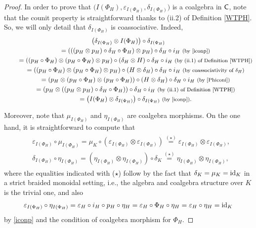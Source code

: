 \documentclass[pdftex]{sigma}
\numberwithin{equation}{section}
\begin{document}
\begin{proof}
In order to prove that $\bigl(I(\Phi_{H}),\varepsilon_{I(\Phi_{H})},\delta_{I(\Phi_{H})}\bigr)$ is a coalgebra in $\sf{C}$, note that the counit property is straightforward thanks to (ii.2) of Definition \ref{WTPH}. So, we will only detail that $\delta_{I(\Phi_{H})}$ is coassociative. Indeed,
\begin{gather*}
 \bigl(\delta_{I(\Phi_{H})}\otimes I(\Phi_{H})\bigr)\circ \delta_{I(\Phi_{H})}\\
 \qquad{}= (((p_{H}\otimes p_{H})\circ\delta_{H}\circ\Phi_{H})\otimes p_{H})\circ\delta_{H}\circ i_{H}\ \text{\footnotesize\textnormal{(by \eqref{iconp})}}\\
 \qquad{}= ((p_{H}\circ \Phi_{H})\otimes(p_{H}\circ \Phi_{H})\otimes p_{H})\circ(\delta_{H}\otimes H)\circ\delta_{H}\circ i_{H}\ \text{\footnotesize\textnormal{(by (ii.1) of Definition \ref{WTPH})}}\\
 \qquad{}= ((p_{H}\circ\Phi_{H})\otimes (p_{H}\circ \Phi_{H})\otimes p_{H})\circ(H\otimes \delta_{H})\circ\delta_{H}\circ i_{H}\ \text{\footnotesize\textnormal{(by coassociativity of $\delta_{H}$)}}\\
 \qquad{}= (p_{H}\otimes(p_{H}\circ\Phi_{H})\otimes(p_{H}\circ \Phi_{H}))\circ(H\otimes\delta_{H})\circ\delta_{H}\circ i_{H}\ \text{\footnotesize\textnormal{(by \eqref{Phiconi})}}\\
 \qquad{}= (p_{H}\otimes((p_{H}\otimes p_{H})\circ\delta_{H}\circ\Phi_{H}))\circ\delta_{H}\circ i_{H}\ \text{\footnotesize\textnormal{(by (ii.1) of Definition \ref{WTPH})}}\\
 \qquad{}= \bigl(I(\Phi_{H})\otimes\delta_{I(\Phi_{H})}\bigr)\circ\delta_{I(\Phi_{H})}\ \text{\footnotesize\textnormal{(by \eqref{iconp})}}.
\end{gather*}

Moreover, note that $\mu_{I(\Phi_{H})}$ and $\eta_{I(\Phi_{H})}$ are coalgebra morphisms. On the one hand, it is straightforward to compute that
\begin{gather*}
\begin{split}
& \varepsilon_{I(\Phi_{H})}\circ\mu_{I(\Phi_{H})}=\mu_{K}\circ(\varepsilon_{I(\Phi_{H})}\otimes\varepsilon_{I(\Phi_{H})})\overset{(\star)}{=}\varepsilon_{I(\Phi_{H})} \otimes\varepsilon_{I(\Phi_{H})},\\
& \delta_{I(\Phi_{H})}\circ\eta_{I(\Phi_{H})}=(\eta_{I(\Phi_{H})}\otimes \eta_{I(\Phi_{H})})\circ\delta_{K}\overset{(\star)}{=}\eta_{I(\Phi_{H})}\otimes \eta_{I(\Phi_{H})},
\end{split}
\end{gather*}
where the equalities indicated with ($\star$) follow by the fact that $\delta_{K}=\mu_{K}={\rm id}_{K}$ in a strict braided monoidal setting, i.e., the algebra and coalgebra structure over $K$ is the trivial one, and also
\begin{align*}
\varepsilon_{I(\Phi_{H})}\circ\eta_{I(\Phi_{H})}=\varepsilon_{H}\circ i_{H}\circ p_{H}\circ \eta_{H}=\varepsilon_{H}\circ\Phi_{H}\circ\eta_{H}=\varepsilon_{H}\circ\eta_{H}={\rm id}_{K}
\end{align*}
by \eqref{iconp} and the condition of coalgebra morphism for $\Phi_{H}$.


\end{proof}
\end{document}
